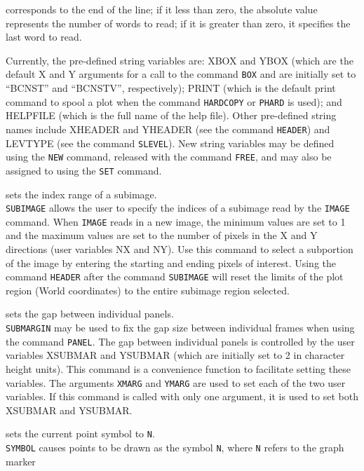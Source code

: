 	corresponds to the end of the line; if it less than zero, the
	absolute value represents the number of words to read; if it
	is greater than zero, it specifies the last word to read.
	\par 
	Currently, the pre-defined string variables are: XBOX and YBOX
	(which are the default X and Y arguments for a call to the
	command {\tt BOX} and are initially
	set to ``BCNST'' and ``BCNSTV'', respectively); PRINT (which is
	the default print command to spool a plot when the command
	{\tt HARDCOPY} or
	{\tt PHARD} is used); and
	HELPFILE (which is the full name of the help file).  Other
	pre-defined string names include XHEADER and YHEADER (see
	the command {\tt HEADER}) and LEVTYPE
	(see the command {\tt SLEVEL}).  New
	string variables may be defined using the
	{\tt NEW} command, released with the
	command {\tt FREE}, and may also be
	assigned to using the {\tt SET} command.
\item [{\tt SUBIMAGE xmin xmax ymin ymax } --] sets the index range of a subimage.\\
	{\tt SUBIMAGE} allows the user to specify the indices
	of a subimage read by the {\tt IMAGE}
	command.  When {\tt IMAGE} reads in
	a new image, the minimum values are set to 1 and the maximum
	values are set to the number of pixels in the X and Y directions
	(user variables NX and NY).  Use this command to select a subportion
	of the image by entering the starting and ending pixels of
	interest.  Using the command {\tt HEADER}
	after the command {\tt SUBIMAGE} will
	reset the limits of the plot region (World coordinates) to the
	entire subimage region selected.
\item [{\tt SUBMARGIN xmarg [ymarg] } --] sets the gap between individual panels.\\
	{\tt SUBMARGIN} may be used to fix the gap size between
	individual frames when using the command
	{\tt PANEL}.  The gap between
	individual panels is controlled by the user variables
	XSUBMAR and YSUBMAR (which are initially set to 2 in character
	height units).  This command is a convenience function to
	facilitate setting these variables.  The arguments {\tt XMARG}
	and {\tt YMARG} are used to set each of the two user variables.
	If this command is called with only one argument, it is used to
	set both XSUBMAR and YSUBMAR.
\item [{\tt SYMBOL N } --] sets the current point symbol to {\tt N}.\\
	{\tt SYMBOL} causes points to be drawn as the symbol
	{\tt N}, where {\tt N} refers to the graph marker
